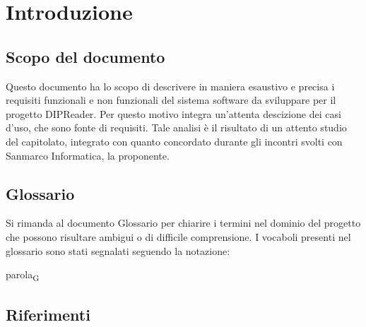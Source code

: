 \documentclass[a4paper,12pt]{article}
\begin{document}
    \section{Introduzione} {
        \subsection{Scopo del documento} {        
            Questo documento ha lo scopo di descrivere in maniera esaustivo e precisa i requisiti funzionali e non funzionali del sistema software da sviluppare per il progetto DIPReader. Per questo motivo integra un'attenta descizione dei casi d'uso, che sono fonte di requisiti.
            Tale analisi è il risultato di un attento studio del capitolato, integrato con quanto concordato durante gli incontri svolti con Sanmarco Informatica, la proponente.
        }
        \subsection{Glossario} {
            Si rimanda al documento Glossario per chiarire i termini nel dominio del progetto che possono risultare ambigui o di difficile comprensione. I vocaboli presenti nel glossario sono stati segnalati seguendo la notazione:
            \begin{center}
                parola\textsubscript{G}
            \end{center}
        }
        \subsection{Riferimenti} {
}}
\end{document}
